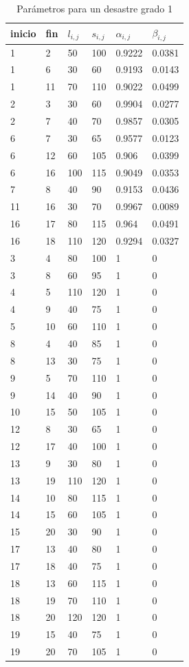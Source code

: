 \documentclass[letter, 10pt]{article}
\begin{document}
\begin{table}[H]
\centering
\begin{tabular}{|l|l|l|l|l|l|}
\hline
inicio & fin & $l_{i,j}$ & $s_{i,j}$ & $\alpha_{i,j}$ & $\beta_{i,j}$ \\ \hline
1 & 2 & 50 & 100 & 0.9222 & 0.0381 \\ \hline
1 & 6 & 30 & 60 & 0.9193 & 0.0143 \\ \hline
1 & 11 & 70 & 110 & 0.9022 & 0.0499 \\ \hline
2 & 3 & 30 & 60 & 0.9904 & 0.0277 \\ \hline
2 & 7 & 40 & 70 & 0.9857 & 0.0305 \\ \hline
6 & 7 & 30 & 65 & 0.9577 & 0.0123 \\ \hline
6 & 12 & 60 & 105 & 0.906 & 0.0399 \\ \hline
6 & 16 & 100 & 115 & 0.9049 & 0.0353 \\ \hline
7 & 8 & 40 & 90 & 0.9153 & 0.0436 \\ \hline
11 & 16 & 30 & 70 & 0.9967 & 0.0089 \\ \hline
16 & 17 & 80 & 115 & 0.964 & 0.0491 \\ \hline
16 & 18 & 110 & 120 & 0.9294 & 0.0327 \\ \hline
3 & 4 & 80 & 100 & 1 & 0 \\ \hline
3 & 8 & 60 & 95 & 1 & 0 \\ \hline
4 & 5 & 110 & 120 & 1 & 0 \\ \hline
4 & 9 & 40 & 75 & 1 & 0 \\ \hline
5 & 10 & 60 & 110 & 1 & 0 \\ \hline
8 & 4 & 40 & 85 & 1 & 0 \\ \hline
8 & 13 & 30 & 75 & 1 & 0 \\ \hline
9 & 5 & 70 & 110 & 1 & 0 \\ \hline
9 & 14 & 40 & 90 & 1 & 0 \\ \hline
10 & 15 & 50 & 105 & 1 & 0 \\ \hline
12 & 8 & 30 & 65 & 1 & 0 \\ \hline
12 & 17 & 40 & 100 & 1 & 0 \\ \hline
13 & 9 & 30 & 80 & 1 & 0 \\ \hline
13 & 19 & 110 & 120 & 1 & 0 \\ \hline
14 & 10 & 80 & 115 & 1 & 0 \\ \hline
14 & 15 & 60 & 105 & 1 & 0 \\ \hline
15 & 20 & 30 & 90 & 1 & 0 \\ \hline
17 & 13 & 40 & 80 & 1 & 0 \\ \hline
17 & 18 & 40 & 75 & 1 & 0 \\ \hline
18 & 13 & 60 & 115 & 1 & 0 \\ \hline
18 & 19 & 70 & 110 & 1 & 0 \\ \hline
18 & 20 & 120 & 120 & 1 & 0 \\ \hline
19 & 15 & 40 & 75 & 1 & 0 \\ \hline
19 & 20 & 70 & 105 & 1 & 0 \\ \hline

\end{tabular}
\caption{Parámetros para un desastre grado 1}
\label{grade1}
\end{table}
\end{document}
